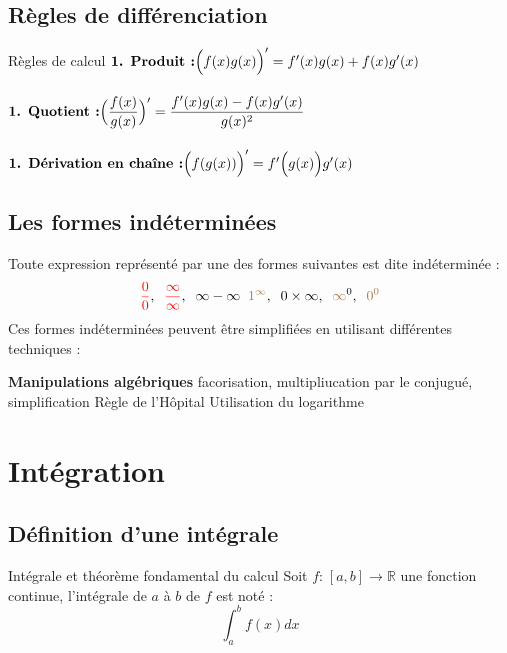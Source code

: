 \documentclass[2pt]{report}
\begin{document}
\begin{multicols*}{3}
\section{Règles de différenciation}
\begin{Concept}{Règles de calcul}{}
  $\textbf{1. Produit :} \Bigl(f(x)g(x)\Bigr)^{\prime} = f^{\prime}(x)g(x) + f(x)g^{\prime}(x)$ \\\\
  $\textbf{1. Quotient :} \Bigl(\dfrac{f(x)}{g(x)}\Bigr)^{\prime} = \dfrac{f^{\prime}(x)g(x) - f(x)g^{\prime}(x)}{g(x)^2}$ \\\\
  $\textbf{1. Dérivation en chaîne :} \Bigl(f(g(x)) \Bigr)^{\prime} = f^{\prime}\Bigl(g(x)\Bigr)g^{\prime}(x)$
\end{Concept} 

\section{Les formes indéterminées}
Toute expression représenté par une des formes suivantes est dite \textcolor{myb}{indéterminée} :
\begin{align*}
  \textcolor{red}{\dfrac{0}{0}}, \;\; \textcolor{red}{\dfrac{\infty}{\infty}}, \;\; 
  \textcolor{black}{\infty - \infty} \;\; \textcolor{myyellow}{1^{\infty}}, \;\; 
  0 \times \infty, \;\; \textcolor{myyellow}\infty^{0}, \;\; \textcolor{myyellow}{0^0}   
\end{align*}
Ces formes indéterminées peuvent être simplifiées en utilisant différentes techniques :
\begin{enumerate}
   \textbf{Manipulations algébriques} facorisation, multipliucation par le conjugué, simplification
   Règle de l'Hôpital 
   Utilisation du logarithme
\end{enumerate}

\chapter{Intégration}
\section{Définition d'une intégrale}

\begin{Concept}{Intégrale et théorème fondamental du calcul}{}
  Soit $f \text{:} \; [a,b] \rightarrow \mathbb{R} $ une fonction continue, \textcolor{myb}{l'intégrale} 
  de $a$ à $b$ de $f$ est noté :  
  \[ \int_{a}^{b}f(x)dx \]
\end{Concept}



\end{multicols*}
\end{document}
